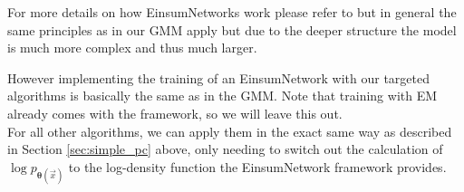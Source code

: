 For more details on how EinsumNetworks work please refer to \cite{einsum} but in general the same 
principles as in our GMM apply but due to the deeper structure the model is much more complex and thus much larger. 

However implementing the training of an EinsumNetwork with our targeted algorithms is basically the same 
as in the GMM. Note that training with EM already comes with the framework, so we will leave this out. \\
For all other algorithms, we can apply them in the exact same way as described in Section \ref{sec:simple_pc} above, only needing 
to switch out the calculation of $\log p_{\boldsymbol{\theta}(\vec x)}$ to the log-density function the EinsumNetwork framework provides. 
